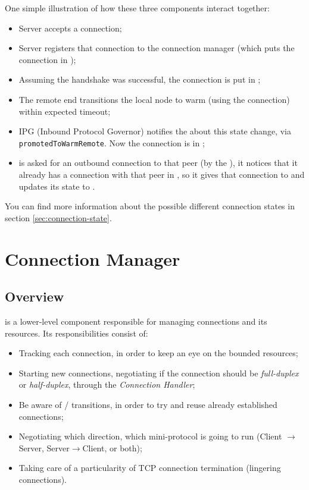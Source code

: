 One simple illustration of how these three components interact together:

\begin{itemize}
    \item Server accepts a connection;
    \item Server registers that connection to the connection manager (which puts the
      connection in \UnnegotiatedStateIn{});
    \item Assuming the handshake was successful, the connection is put in
      \InboundIdleStateDup{};
    \item The remote end transitions the local node to warm (using the connection) within expected timeout;
    \item IPG (Inbound Protocol Governor) notifies the \Connmngr{} about this state
      change, via \texttt{promotedToWarmRemote}. Now the connection is
      in \InboundStateDup{};
    \item \Connmngr{} is asked for an outbound connection to that peer (by the \ptopgov{}), it notices
      that it already has a connection with that peer in \InboundStateDup{}, so it gives
      that connection to \ptopgov{} and updates its state to \DuplexState{}.
\end{itemize}

You can find more information about the possible different connection states in section
\ref{sec:connection-state}.

\section{Connection Manager}

\subsection{Overview}

\Connmngr{} is a lower-level component responsible for managing connections and its
resources. Its responsibilities consist of:

\begin{itemize}
    \item Tracking each connection, in order to keep an eye on the bounded resources;
    \item Starting new connections, negotiating if the connection should be
      \emph{full-duplex} or \emph{half-duplex}, through the \emph{Connection Handler};
    \item Be aware of \warm{}/\hot{} transitions, in order to try and reuse already established
      connections;
    \item Negotiating which direction, which mini-protocol is going to run
      (Client $\rightarrow$ Server, Server$\rightarrow$Client, or both);
    \item Taking care of a particularity of TCP connection termination (lingering
      connections).
\end{itemize}

